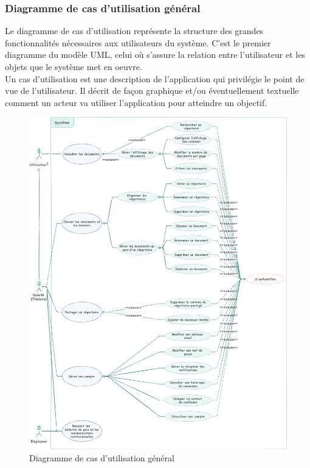 \subsubsection{Diagramme de cas d'utilisation général}
Le diagramme de cas d'utilisation représente la structure des grandes fonctionnalités nécessaires aux utilisateurs du système. C'est le premier diagramme du modèle UML,
celui où s'assure la relation entre l'utilisateur et les objets que le système met en oeuvre.\\
Un cas d'utilisation est une description de l'application qui privilégie le point de vue de l'utilisateur. Il décrit de façon graphique et/ou éventuellement textuelle comment un acteur va utiliser l'application pour atteindre un objectif.
\begin{figure}[H]
    \includegraphics[width=1.1\linewidth]{images/sec3/usecase.pdf}
    \caption{Diagramme de cas d'utilisation général}
\end{figure}
\newpage
